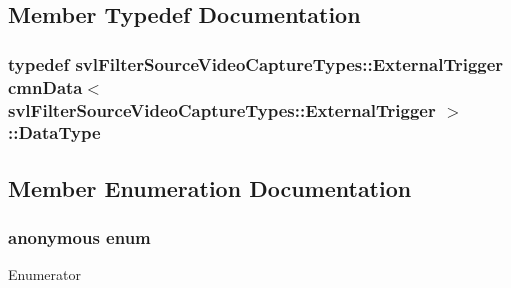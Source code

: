 \subsection{Member Typedef Documentation}
\hypertarget{classcmn_data_3_01svl_filter_source_video_capture_types_1_1_external_trigger_01_4_a40012c3eec7676d2b0252443ae621472}{
\subsubsection[{Data\-Type}]{\setlength{\rightskip}{0pt plus 5cm}typedef {\bf svl\-Filter\-Source\-Video\-Capture\-Types\-::\-External\-Trigger} {\bf cmn\-Data}$<$ {\bf svl\-Filter\-Source\-Video\-Capture\-Types\-::\-External\-Trigger} $>$\-::{\bf Data\-Type}}}\label{classcmn_data_3_01svl_filter_source_video_capture_types_1_1_external_trigger_01_4_a40012c3eec7676d2b0252443ae621472}


\subsection{Member Enumeration Documentation}
\hypertarget{classcmn_data_3_01svl_filter_source_video_capture_types_1_1_external_trigger_01_4_a7b41d22e616ef5e06a38c2491ecccbda}{\subsubsection[{anonymous enum}]{\setlength{\rightskip}{0pt plus 5cm}anonymous enum}}\label{classcmn_data_3_01svl_filter_source_video_capture_types_1_1_external_trigger_01_4_a7b41d22e616ef5e06a38c2491ecccbda}
\begin{Desc}
\item[Enumerator]\par
\begin{description}
\item[{\em 
\hypertarget{classcmn_data_3_01svl_filter_source_video_capture_types_1_1_external_trigger_01_4_a7b41d22e616ef5e06a38c2491ecccbdaadc3c140213120ad9726d550daf5993a7}{I\-S\-\_\-\-S\-P\-E\-C\-I\-A\-L\-I\-Z\-E\-D}\label{classcmn_data_3_01svl_filter_source_video_capture_types_1_1_external_trigger_01_4_a7b41d22e616ef5e06a38c2491ecccbdaadc3c140213120ad9726d550daf5993a7}
}]\end{description}
\end{Desc}



